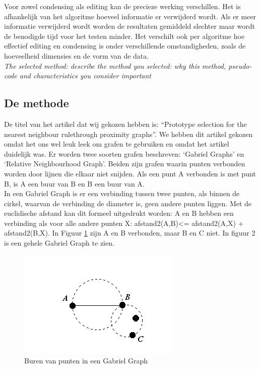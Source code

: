 \documentclass{article}
\begin{document}
Voor zowel condensing als editing kan de precieze werking verschillen. Het is afhankelijk van het algoritme hoeveel informatie er verwijderd wordt. Als er meer informatie verwijderd wordt worden de resultaten gemiddeld slechter maar wordt de benodigde tijd voor het testen minder. Het verschilt ook per algoritme hoe effectief editing en condensing is onder verschillende omstandigheden, zoals de hoeveelheid dimensies en de vorm van de data.\\

\emph{The selected method: describe the method you selected: why this method, pseudo-code and characteristics you consider important}\\

\subsection{De methode}
De titel van het artikel dat wij gekozen hebben is: “Prototype selection for the nearest neighbour rulethrough proximity graphs”. We hebben dit artikel gekozen omdat het ons wel leuk leek om grafen te gebruiken en omdat het artikel duidelijk was. Er worden twee soorten grafen beschreven: ‘Gabriel Graphs’ en ‘Relative Neighbourhood Graph’. Beiden zijn grafen waarin punten verbonden worden door lijnen die elkaar niet snijden. Als een punt A verbonden is met punt B, is A een buur van B en B een buur van A.\\

In een Gabriel Graph is er een verbinding tussen twee punten, als binnen de cirkel, waarvan de verbinding de diameter is, geen andere punten liggen. Met de euclidische afstand kan dit formeel uitgedrukt worden: A en B hebben een verbinding als voor alle andere punten X: afstand2(A,B)<= afstand2(A,X) + afstand2(B,X). In Figuur \ref{GGburen} zijn A en B verbonden, maar B en C niet. In figuur 2 is een gehele Gabriel Graph te zien. \\


\begin{figure}[h!]
    \centering
        \includegraphics[scale=1, page=1]{GGburen}
    \caption{Buren van punten in een Gabriel Graph}
    \label{GGburen}
\end{figure}
\end{document}
